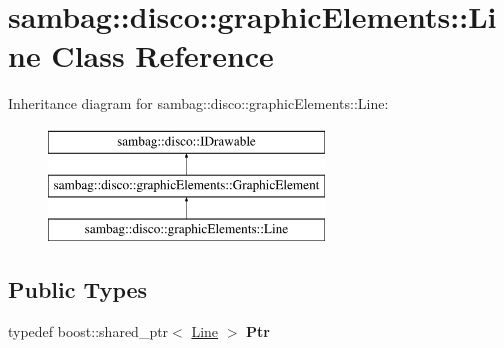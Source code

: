 \hypertarget{classsambag_1_1disco_1_1graphic_elements_1_1_line}{
\section{sambag::disco::graphicElements::Line Class Reference}
\label{classsambag_1_1disco_1_1graphic_elements_1_1_line}
}
Inheritance diagram for sambag::disco::graphicElements::Line:\begin{figure}[H]
\begin{center}
\leavevmode
\includegraphics[height=3.000000cm]{classsambag_1_1disco_1_1graphic_elements_1_1_line}
\end{center}
\end{figure}
\subsection*{Public Types}
\begin{DoxyCompactItemize}
\item 
\hypertarget{classsambag_1_1disco_1_1graphic_elements_1_1_line_ab41609abeaac28745e73ed8783b08052}{
typedef boost::shared\_\-ptr$<$ \hyperlink{classsambag_1_1disco_1_1graphic_elements_1_1_line}{Line} $>$ {\bfseries Ptr}}
\label{classsambag_1_1disco_1_1graphic_elements_1_1_line_ab41609abeaac28745e73ed8783b08052}

\end{DoxyCompactItemize}
